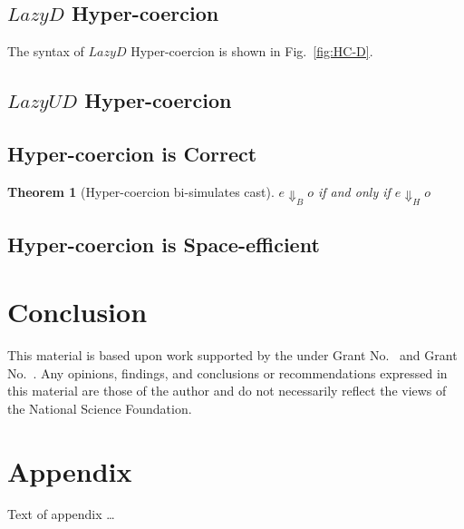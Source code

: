 \documentclass[acmsmall,review,anonymous]{acmart}\settopmatter{printfolios=true,printccs=false,printacmref=false}
\newtheorem{theorem}{Theorem}[section]
\newcommand{\figref}[1]{Fig.~\ref{#1}}
\begin{document}
\subsection{$Lazy D$ Hyper-coercion}

The syntax of $ Lazy D $ Hyper-coercion is shown in \figref{fig:HC-D}.

\subsection{$Lazy UD$ Hyper-coercion}

\subsection{Hyper-coercion is Correct}

\begin{theorem}[Hyper-coercion bi-simulates cast]	
	$ e \Downarrow_B o $ if and only if $ e \Downarrow_H o $
\end{theorem}

\subsection{Hyper-coercion is Space-efficient}

\section{Conclusion} \label{sec:conclude}

\begin{acks}                            %
  This material is based upon work supported by the
   under Grant
  No.~ and Grant
  No.~.  Any opinions, findings, and
  conclusions or recommendations expressed in this material are those
  of the author and do not necessarily reflect the views of the
  National Science Foundation.
\end{acks}





\appendix
\section{Appendix}

Text of appendix \ldots
\end{document}
